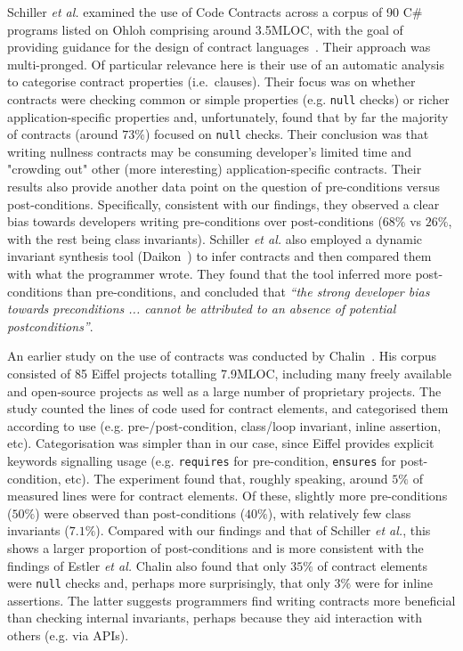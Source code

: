 \documentclass[a4paper,UKenglish]{lipics-v2016}
\begin{document}
Schiller {\em et al.} examined the use of Code Contracts across a corpus of 90 C\# programs listed on Ohloh comprising around 3.5MLOC, with the goal of providing guidance for the design of contract languages~\cite{SDCE14}.  Their approach was multi-pronged.  Of particular relevance here is their use of an automatic analysis to categorise contract properties (i.e.\ clauses).  Their focus was on whether contracts were checking common or simple properties (e.g. \lstinline{null} checks) or richer application-specific properties and, unfortunately, found that by far the majority of contracts (around $73\%$) focused on \lstinline{null} checks.  Their conclusion was that writing nullness contracts may be consuming developer's limited time and "crowding out" other (more interesting) application-specific contracts.  Their results also provide another data point on the question of pre-conditions versus post-conditions.  Specifically, consistent with our findings, they observed a clear bias towards developers writing pre-conditions over post-conditions ($68\%$ vs $26\%$, with the rest being class invariants).   Schiller {\em et al.} also employed a dynamic invariant synthesis tool (Daikon~\cite{EPGMPTX07}) to infer contracts and then compared them with what the programmer wrote.  They found that the tool inferred more post-conditions than pre-conditions, and concluded that {\em ``the strong developer bias towards preconditions ... cannot be attributed to an absence of potential postconditions''}.

An earlier study on the use of contracts was conducted by Chalin~\cite{Cha06}.  His corpus consisted of 85 Eiffel projects totalling 7.9MLOC, including many freely available and open-source projects as well as a large number of proprietary projects.  The study counted the lines of code used for contract elements, and categorised them according to use (e.g. pre-/post-condition, class/loop invariant, inline assertion, etc).  Categorisation was simpler than in our case, since Eiffel provides explicit keywords signalling usage (e.g. \lstinline{requires} for pre-condition, \lstinline{ensures} for post-condition, etc).  The experiment found that, roughly speaking, around $5\%$ of measured lines were for contract elements.  Of these, slightly more pre-conditions ($50\%$) were observed than post-conditions ($40\%$), with relatively few class invariants ($7.1\%$).  Compared with our findings and that of Schiller {\em et al.}, this shows a larger proportion of post-conditions and is more consistent with the findings of Estler {\em et al.}  Chalin also found that only $35\%$ of contract elements were \lstinline{null} checks and, perhaps more surprisingly, that only $3\%$ were for inline assertions.  The latter suggests programmers find writing contracts more beneficial than checking internal invariants, perhaps because they aid interaction with others (e.g. via APIs).
\end{document}
